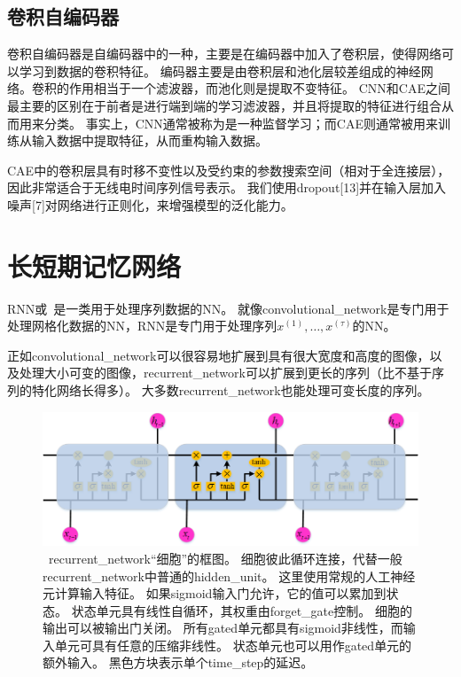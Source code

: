 \subsection{卷积自编码器}
卷积自编码器是自编码器中的一种，主要是在编码器中加入了卷积层，使得网络可以学习到数据的卷积特征。
编码器主要是由卷积层和池化层较差组成的神经网络。卷积的作用相当于一个滤波器，而池化则是提取不变特征。
CNN和CAE之间最主要的区别在于前者是进行端到端的学习滤波器，并且将提取的特征进行组合从而用来分类。
事实上，CNN通常被称为是一种监督学习；而CAE则通常被用来训练从输入数据中提取特征，从而重构输入数据。\par

CAE中的卷积层具有时移不变性以及受约束的参数搜索空间（相对于全连接层），因此非常适合于无线电时间序列信号表示。
我们使用dropout[13]并在输入层加入噪声[7]对网络进行正则化，来增强模型的泛化能力。\par

\section{长短期记忆网络}
\label{sec:lstm}
\label{chap:sequence_modeling_recurrent_and_recursive_nets}
\gls{RNN}或~是一类用于处理序列数据的\gls{NN}。
就像\gls{convolutional_network}是专门用于处理网格化数据的\gls{NN}，\gls{RNN}是专门用于处理序列$x^{(1)}, \dots, x^{(\tau)}$的\gls{NN}。

正如\gls{convolutional_network}可以很容易地扩展到具有很大宽度和高度的图像，以及处理大小可变的图像，\gls{recurrent_network}可以扩展到更长的序列（比不基于序列的特化网络长得多）。
大多数\gls{recurrent_network}也能处理可变长度的序列。

\begin{figure}[!h]
	\centering
	\includegraphics[scale=0.7]{figures/chapter_2/fig_2_6.png}
	\caption{~\gls{recurrent_network}``细胞''的框图。
		细胞彼此循环连接，代替一般\gls{recurrent_network}中普通的\gls{hidden_unit}。
		这里使用常规的人工神经元计算输入特征。
		如果sigmoid输入门允许，它的值可以累加到状态。
		状态单元具有线性自循环，其权重由\gls{forget_gate}控制。
		细胞的输出可以被输出门关闭。
		所有\gls{gated}单元都具有sigmoid非线性，而输入单元可具有任意的压缩非线性。
		状态单元也可以用作\gls{gated}单元的额外输入。
		黑色方块表示单个\gls{time_step}的延迟。
	}\label{fig:chapter2_lstm_cell}
\end{figure}

